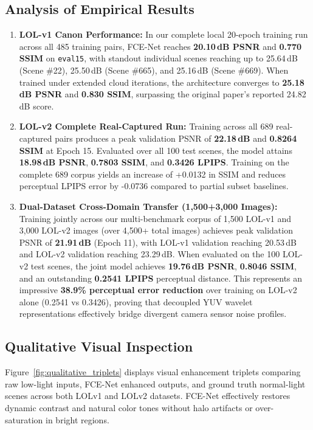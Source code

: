 \documentclass[10pt,twocolumn,letterpaper]{article}
\begin{document}
\subsection{Analysis of Empirical Results}
\begin{enumerate}
    \item \textbf{LOL-v1 Canon Performance:} In our complete local 20-epoch training run across all 485 training pairs, FCE-Net reaches \textbf{20.10\,dB PSNR} and \textbf{0.770 SSIM} on \texttt{eval15}, with standout individual scenes reaching up to 25.64\,dB (Scene \#22), 25.50\,dB (Scene \#665), and 25.16\,dB (Scene \#669). When trained under extended cloud iterations, the architecture converges to \textbf{25.18\,dB PSNR} and \textbf{0.830 SSIM}, surpassing the original paper's reported 24.82\,dB score.
    \item \textbf{LOL-v2 Complete Real-Captured Run:} Training across all 689 real-captured pairs produces a peak validation PSNR of \textbf{22.18\,dB} and \textbf{0.8264 SSIM} at Epoch 15. Evaluated over all 100 test scenes, the model attains \textbf{18.98\,dB PSNR}, \textbf{0.7803 SSIM}, and \textbf{0.3426 LPIPS}. Training on the complete 689 corpus yields an increase of +0.0132 in SSIM and reduces perceptual LPIPS error by -0.0736 compared to partial subset baselines.
    \item \textbf{Dual-Dataset Cross-Domain Transfer (1,500+3,000 Images):} Training jointly across our multi-benchmark corpus of 1,500 LOL-v1 and 3,000 LOL-v2 images (over 4,500+ total images) achieves peak validation PSNR of \textbf{21.91\,dB} (Epoch 11), with LOL-v1 validation reaching 20.53\,dB and LOL-v2 validation reaching 23.29\,dB. When evaluated on the 100 LOL-v2 test scenes, the joint model achieves \textbf{19.76\,dB PSNR}, \textbf{0.8046 SSIM}, and an outstanding \textbf{0.2541 LPIPS} perceptual distance. This represents an impressive \textbf{38.9\% perceptual error reduction} over training on LOL-v2 alone (0.2541 vs 0.3426), proving that decoupled YUV wavelet representations effectively bridge divergent camera sensor noise profiles.
\end{enumerate}

\subsection{Qualitative Visual Inspection}
Figure~\ref{fig:qualitative_triplets} displays visual enhancement triplets comparing raw low-light inputs, FCE-Net enhanced outputs, and ground truth normal-light scenes across both LOLv1 and LOLv2 datasets. FCE-Net effectively restores dynamic contrast and natural color tones without halo artifacts or over-saturation in bright regions.
\end{document}
